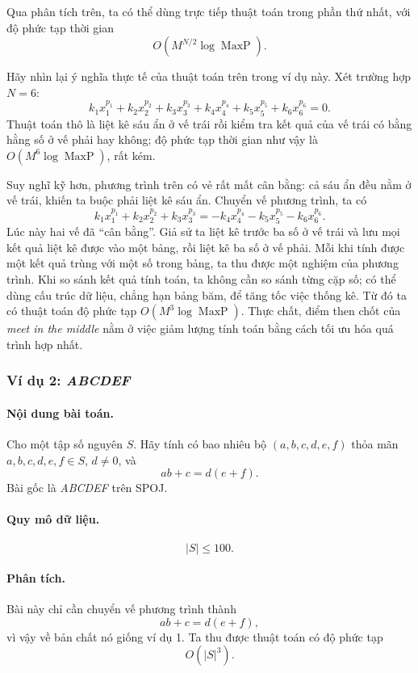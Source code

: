 \documentclass[11pt]{article}
\begin{document}
Qua phân tích trên, ta có thể dùng trực tiếp thuật toán trong phần thứ nhất,
với độ phức tạp thời gian
\[
  O(M^{N/2}\log \operatorname{MaxP}).
\]

Hãy nhìn lại ý nghĩa thực tế của thuật toán trên trong ví dụ này. Xét trường
hợp \(N=6\):
\[
  k_1x_1^{p_1}+k_2x_2^{p_2}+k_3x_3^{p_3}
  +k_4x_4^{p_4}+k_5x_5^{p_5}+k_6x_6^{p_6}=0.
\]
Thuật toán thô là liệt kê sáu ẩn ở vế trái rồi kiểm tra kết quả của vế trái
có bằng hằng số ở vế phải hay không; độ phức tạp thời gian như vậy là
\(O(M^6\log \operatorname{MaxP})\), rất kém.

Suy nghĩ kỹ hơn, phương trình trên có vẻ rất mất cân bằng: cả sáu ẩn đều nằm
ở vế trái, khiến ta buộc phải liệt kê sáu ẩn. Chuyển vế phương trình, ta có
\[
  k_1x_1^{p_1}+k_2x_2^{p_2}+k_3x_3^{p_3}
  =
  -k_4x_4^{p_4}-k_5x_5^{p_5}-k_6x_6^{p_6}.
\]
Lúc này hai vế đã ``cân bằng''. Giả sử ta liệt kê trước ba số ở vế trái và
lưu mọi kết quả liệt kê được vào một bảng, rồi liệt kê ba số ở vế phải. Mỗi
khi tính được một kết quả trùng với một số trong bảng, ta thu được một
nghiệm của phương trình. Khi so sánh kết quả tính toán, ta không cần so sánh
từng cặp số; có thể dùng cấu trúc dữ liệu, chẳng hạn bảng băm, để tăng tốc
việc thống kê. Từ đó ta có thuật toán độ phức tạp
\(O(M^3\log \operatorname{MaxP})\). Thực chất, điểm then chốt của
\emph{meet in the middle} nằm ở việc giảm lượng tính toán bằng cách tối ưu
hóa quá trình hợp nhất.

\subsubsection{Ví dụ 2: \emph{ABCDEF}}

\paragraph{Nội dung bài toán.}
Cho một tập số nguyên \(S\). Hãy tính có bao nhiêu bộ
\((a,b,c,d,e,f)\) thỏa mãn \(a,b,c,d,e,f\in S\), \(d\ne 0\), và
\[
  ab+c=d(e+f).
\]
Bài gốc là \emph{ABCDEF} trên SPOJ.

\paragraph{Quy mô dữ liệu.}
\[
  |S|\le 100.
\]

\paragraph{Phân tích.}
Bài này chỉ cần chuyển vế phương trình thành
\[
  ab+c=d(e+f),
\]
vì vậy về bản chất nó giống ví dụ 1. Ta thu được thuật toán có độ phức tạp
\[
  O(|S|^3).
\]
\end{document}
